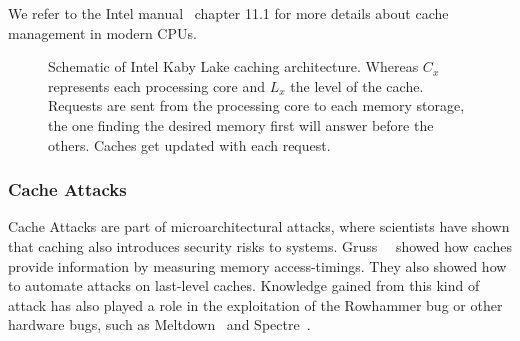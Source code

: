 We refer to the Intel manual~\cite{intelsys} chapter 11.1 for more details about
cache management in modern CPUs.

\begin{figure}
  \centering
  \caption{Schematic of Intel Kaby Lake caching architecture. Whereas $C_x$
represents each processing core and $L_x$ the level of the cache. Requests are
sent from the processing core to each memory storage, the one finding the
desired memory first will answer before the others. Caches get updated with
each request.} \label{fig:intelcache}
\end{figure}

\subsubsection{Cache Attacks}

Cache Attacks are part of microarchitectural attacks, where scientists have
shown that caching also introduces security risks to systems.
Gruss~\etal~\cite{gruss2015cache} showed how caches provide information by
measuring memory access-timings. They also showed how to automate attacks on
last-level caches. Knowledge gained from this kind of attack has also played
a role in the exploitation of the Rowhammer bug or other hardware bugs, such as
Meltdown~\cite{meltdown} and Spectre~\cite{spectre}.


